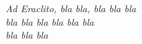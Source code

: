 \newpage\null\thispagestyle{empty}\newpage %
\thispagestyle{empty}
\begin{flushright}
\null{}
{\em Ad Eraclito, bla bla, bla bla bla} \\
{\em bla bla bla bla bla bla} \\
{\em bla bla bla}
\null
\end{flushright}